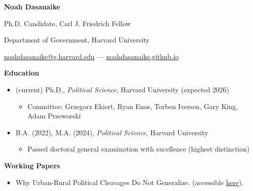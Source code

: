 \documentclass[12pt]{article}
\begin{document}
\begin{footnotesize} 

\begin{center}

{\bf {\large Noah Dasanaike}}

\vspace{3mm} 

Ph.D. Candidate, Carl J. Friedrich Fellow

Department of Government, Harvard University

\href{mailto:noahdasanaike@g.harvard.edu}{noahdasanaike@g.harvard.edu} — \href{https://noahdasanaike.github.io}{noahdasanaike.github.io}

\end{center}

\vspace{5mm} 


{\bf {\normalsize Education}}
\vspace{3mm} 

\begin{itemize}[noitemsep,nolistsep]
\item (current) Ph.D., \textit{Political Science}, Harvard University (expected 2026)
\vspace{-1.5mm}
\begin{itemize}
\item Committee: Grzegorz Ekiert, Ryan Enos, Torben Iversen, Gary King, Adam Przeworski
\end{itemize}
\item B.A. (2022), M.A. (2024), \textit{Political Science}, Harvard University
\vspace{-1.5mm}
\begin{itemize}
\item Passed doctoral general examination with excellence (highest distinction)
\end{itemize}
\end{itemize}

\vspace{3.5mm} 







{\bf {\normalsize Working Papers}}

\vspace{3mm} 

\begin{itemize}[noitemsep,nolistsep]

\item Why Urban-Rural Political Cleavages Do Not Generalize. (accessible \href{https://www.dropbox.com/scl/fi/f5ol59b0n9exxebt3un5v/Dasanaike_Urban_Rural_2025.pdf?rlkey=m1xcfrvl7ey82k7d5kaakkci3&e=1&st=mjmzzuki&dl=0}{here}).


\end{itemize}
\end{footnotesize}
\end{document}

